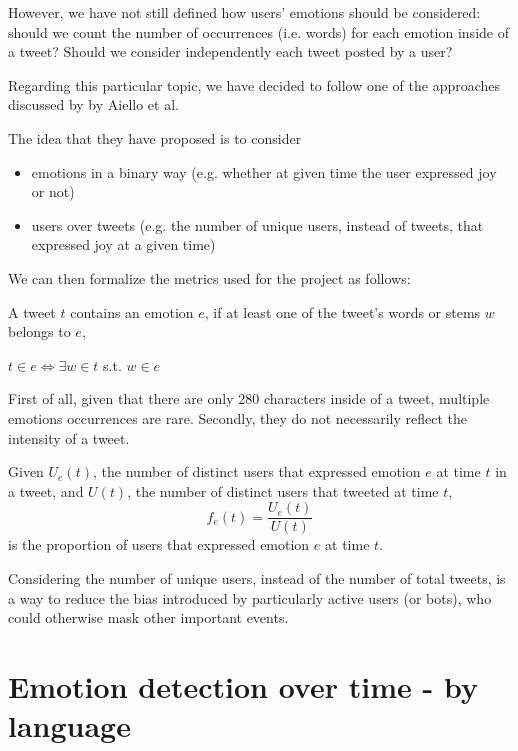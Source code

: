 However, we have not still defined how users' emotions should be considered: should we count the number of occurrences (i.e. words) for each emotion inside of a tweet? Should we consider independently each tweet posted by a user?

Regarding this particular topic, we have decided to follow one of the approaches discussed by  by Aiello et al.~\cite{aiello2020epidemic}

The idea that they have proposed is to consider
	
\begin{itemize}
	\item emotions in a binary way (e.g. whether at given time the user expressed joy or not)
	\item users over tweets (e.g. the number of unique users, instead of tweets, that expressed joy at a given time)
\end{itemize}

We can then formalize the metrics used for the project as follows:

\begin{definition}
\label{def:tweet-emotions}
	A tweet \(t\) contains an emotion \(e\), if at least one of the tweet's words or stems \(w\) belongs to \(e\),
	\begin{center}
		\(t \in e \Leftrightarrow \exists w \in t\)  s.t. \(w \in e\)
	\end{center}
\end{definition}

First of all, given that there are only 280 characters inside of a tweet, multiple emotions occurrences are rare. Secondly, they do not necessarily reflect the intensity of a tweet. 
	
\begin{definition}
\label{def:user-emotions}
	Given \(U_e(t)\), the number of distinct users that expressed emotion \(e\) at time \(t\) in a tweet, and \(U(t)\), the number of distinct users that tweeted at time \(t\),
	\[f_e(t) = \frac{U_e(t)}{U(t)}\]
	is the proportion of users that expressed emotion \(e\) at time \(t\).	
\end{definition}

Considering the number of unique users, instead of the number of total tweets, is a way to reduce the bias introduced by particularly active users (or bots), who could otherwise mask other important events.

\section{Emotion detection over time - by language}
\label{sec:emotion-by-language}

